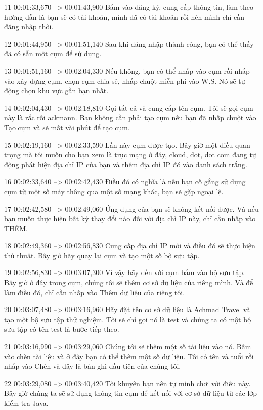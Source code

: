 11
00:01:33,670 --> 00:01:43,900
Bấm vào đăng ký, cung cấp thông tin, làm theo hướng dẫn là bạn sẽ có tài khoản, mình đã có tài khoản rồi nên mình chỉ cần đăng nhập thôi.

12
00:01:44,950 --> 00:01:51,140
Sau khi đăng nhập thành công, bạn có thể thấy đã có sẵn một cụm để sử dụng.

13
00:01:51,160 --> 00:02:04,330
Nếu không, bạn có thể nhấp vào cụm rồi nhấp vào xây dựng cụm, chọn cụm chia sẻ, nhấp chuột miễn phí vào W.S.  Nó sẽ tự động chọn khu vực gần bạn nhất.

14
00:02:04,430 --> 00:02:18,810
Gọi tất cả và cung cấp tên cụm.  Tôi sẽ gọi cụm này là rắc rối ackmann.  Bạn không cần phải tạo cụm nếu bạn đã nhấp chuột vào Tạo cụm và sẽ mất vài phút để tạo cụm.

15
00:02:19,160 --> 00:02:33,590
Lần này cụm được tạo.  Bây giờ một điều quan trọng mà tôi muốn cho bạn xem là trục mạng ở đây, cloud, dot, dot com đang tự động phát hiện địa chỉ IP của bạn và thêm địa chỉ IP đó vào danh sách trắng.

16
00:02:33,640 --> 00:02:42,430
Điều đó có nghĩa là nếu bạn cố gắng sử dụng cụm từ một số máy thông qua một số mạng khác, bạn sẽ gặp ngoại lệ.

17
00:02:42,580 --> 00:02:49,060
Ứng dụng của bạn sẽ không kết nối được.  Và nếu bạn muốn thực hiện bất kỳ thay đổi nào đối với địa chỉ IP này, chỉ cần nhấp vào THÊM.

18
00:02:49,360 --> 00:02:56,830
Cung cấp địa chỉ IP mới và điều đó sẽ thực hiện thủ thuật.  Bây giờ hãy quay lại cụm và tạo một số bộ sưu tập.

19
00:02:56,830 --> 00:03:07,300
Vì vậy hãy đến với cụm bấm vào bộ sưu tập.  Bây giờ ở đây trong cụm, chúng tôi sẽ thêm cơ sở dữ liệu của riêng mình.  Và để làm điều đó, chỉ cần nhấp vào Thêm dữ liệu của riêng tôi.

20
00:03:07,480 --> 00:03:16,960
Hãy đặt tên cơ sở dữ liệu là Achmad Travel và tạo một bộ sưu tập thử nghiệm.  Tôi sẽ chỉ gọi nó là test và chúng ta có một bộ sưu tập có tên test là bước tiếp theo.

21
00:03:16,990 --> 00:03:29,060
Chúng tôi sẽ thêm một số tài liệu vào nó.  Bấm vào chèn tài liệu và ở đây bạn có thể thêm một số dữ liệu.  Tôi có tên và tuổi rồi nhấp vào Chèn và đây là bản ghi đầu tiên của chúng tôi.

22
00:03:29,080 --> 00:03:40,420
Tôi khuyên bạn nên tự mình chơi với điều này.  Bây giờ chúng ta sẽ sử dụng thông tin cụm để kết nối với cơ sở dữ liệu từ các lớp kiểm tra Java.

